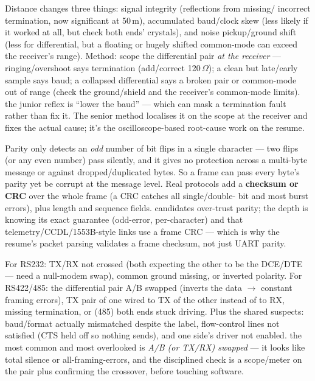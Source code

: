 Distance changes three things: signal integrity (reflections from missing/
incorrect termination, now significant at 50\,m), accumulated baud/clock skew
(less likely if it worked at all, but check both ends' crystals), and noise
pickup/ground shift (less for differential, but a floating or hugely shifted
common-mode can exceed the receiver's range). Method: scope the differential
pair \emph{at the receiver} --- ringing/overshoot says termination
(add/correct 120\,$\Omega$); a clean but late/early sample says baud; a
collapsed differential says a broken pair or common-mode out of range (check the
ground/shield and the receiver's common-mode limits). \trap the junior reflex is
``lower the baud'' --- which can mask a termination fault rather than fix it.
The senior method localises it on the scope at the receiver and fixes the
actual cause; it's the oscilloscope-based root-cause work on the resume.

Parity only detects an \emph{odd} number of bit flips in a single character ---
two flips (or any even number) pass silently, and it gives no protection across
a multi-byte message or against dropped/duplicated bytes. So a frame can pass
every byte's parity yet be corrupt at the message level. Real protocols add a
\textbf{checksum or CRC} over the whole frame (a CRC catches all single/double-
bit and most burst errors), plus length and sequence fields. \trap candidates
over-trust parity; the depth is knowing its exact guarantee (odd-error,
per-character) and that telemetry/CCDL/1553B-style links use a frame CRC ---
which is why the resume's packet parsing validates a frame checksum, not just
UART parity.

For RS232: TX/RX not crossed (both expecting the other to be the DCE/DTE ---
need a null-modem swap), common ground missing, or inverted polarity. For
RS422/485: the differential pair A/B swapped (inverts the data $\rightarrow$
constant framing errors), TX pair of one wired to TX of the other instead of to
RX, missing termination, or (485) both ends stuck driving. Plus the shared
suspects: baud/format actually mismatched despite the label, flow-control lines
not satisfied (CTS held off so nothing sends), and one side's driver not
enabled. \trap the most common and most overlooked is \emph{A/B (or TX/RX)
swapped} --- it looks like total silence or all-framing-errors, and the
disciplined check is a scope/meter on the pair plus confirming the
crossover, before touching software.

